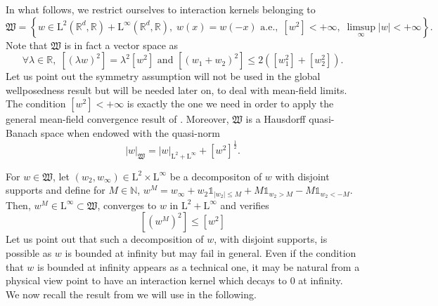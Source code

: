 \documentclass{article}
\def\R{\mathbb R}
\def\N{\mathbb N}
\def\L{\mathrm L}
\newcommand{\indic}[1]{\mathds{1}_{#1}}
\theoremstyle{definition}
\numberwithin{equation}{section}
\begin{document}
In what follows, we restrict ourselves to interaction kernels belonging to
\begin{equation}\label{Eq:DefW}
    \mathfrak{W}=\left\{w\in\L^2(\R^d,\R)+\L^\infty(\R^d,\R),\; w(x)=w(-x)\text{ a.e.},\; \left[w^2\right]<+\infty,\; \limsup_{\infty}|w|<+\infty\right\}.
\end{equation}
Note that $\mathfrak{W}$ is in fact a vector space as 
$$\forall \lambda\in\R,\; \left[(\lambda w)^2\right]=\lambda^2\left[w^2\right]\text{ and }\left[(w_1+w_2)^2\right]\leqslant 2\left(\left[w_1^2\right]+\left[w_2^2\right]\right).$$
Let us point out the symmetry assumption will not be used in the global wellposedness result but will be needed later on, to deal with mean-field limits. The condition $\left[w^2\right]<+\infty$ is exactly the one we need in order to apply the general mean-field convergence result of \cite{PicklKnowles}. Moreover, $\mathfrak{W}$ is a Hausdorff quasi-Banach space when endowed with the quasi-norm
$$|w|_{\mathfrak{W}} = |w|_{\L^2+\L^\infty}+\left[w^2\right]^{\frac{1}{2}}.$$

For $w\in\mathfrak{W}$, let $(w_2,w_\infty)\in\L^2\times\L^\infty$ be a decompositon of $w$ with disjoint supports and define for $M\in\N$, $w^M=w_\infty+w_2\indic{|w_2|\leqslant M}+M\indic{w_2>M}-M\indic{w_2<-M}$. Then, $w^M\in\L^\infty\subset\mathfrak{W}$, converges to $w$ in $\L^2+\L^\infty$ and verifies 
\begin{equation}\label{Eq:Control[wM2]}
    \left[\left(w^M\right)^2\right]\leqslant \left[w^2\right]
\end{equation}
Let us point out that such a decomposition of $w$, with disjoint supports, is possible as $w$ is bounded at infinity but may fail in general. Even if the condition that $w$ is bounded at infinity appears as a technical one, it may be natural from a physical view point to have an interaction kernel which decays to $0$ at infinity.\\

We now recall the result from \cite{PicklKnowles} we will use in the following.
\end{document}
